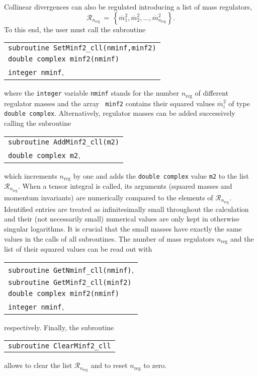 \documentclass[preprint,sort&compress,12pt]{elsarticle}
\makeatletter
\def\bce{\begin{center}}
\def\ece{\end{center}}
\newlength{\parwidth}\newlength{\colonewidth}%
\newcommand{\cpcsub}[1]
{%
\setlength{\parwidth}{\textwidth}\addtolength{\parwidth}{-2.1em}%
\bce
\begin{tabular}[t]{@{}p{\parwidth}@{}}
#1
\end{tabular}
\ece
}%
\makeatother
\begin{document}
Collinear divergences can also be regulated introducing a list of mass regulators,
\begin{equation}
  \mathcal{R}_{n_{\textrm{reg}}}\,=\,\left\{\overline{m}_1^{2},\overline{m}_2^{2},\ldots,
  \overline{m}_{n_{\textrm{reg}}}^{2}\right\}.\label{eq:regmasses}
\end{equation}
To this end, the user must call the subroutine
\cpcsub{
{\tt subroutine  SetMinf2\_cll(nminf,minf2)}\\
{\tt double complex minf2(nminf)} \\
{\tt integer nminf}\;, \\
}
where the {\tt integer} variable {\tt nminf} stands for the number
$n_{\textrm{reg}}$ of different regulator masses and the array {\tt
  minf2} contains their squared values $\overline{m}_i^{2}$ of type
{\tt double complex}. Alternatively, regulator masses can be added
successively calling the subroutine
\cpcsub{
{\tt subroutine  AddMinf2\_cll(m2)}\\
{\tt double complex m2}\;, \\
}
which increments $n_{\textrm{reg}}$ by one and adds the {\tt double complex} value {\tt m2} to the list $\mathcal{R}_{n_{\textrm{reg}}}$.
When a tensor integral is called, its arguments (squared masses and momentum invariants) are numerically compared to the elements of 
$\mathcal{R}_{n_{\textrm{reg}}}$. Identified entries are treated as infinitesimally small throughout the calculation 
and their (not necessarily small) numerical values are only kept in otherwise singular logarithms.
It is crucial that the small masses have exactly the same values in the calls of all subroutines.
The number of mass regulators $n_{\textrm{reg}}$ and the list
of their squared values can be read out with
\cpcsub{
{\tt subroutine  GetNminf\_cll(nminf)}\;,\\
{\tt subroutine  GetMinf2\_cll(minf2)}\\
{\tt double complex minf2(nminf)} \\
{\tt integer nminf}\;, \\
}
respectively. Finally, the subroutine
\cpcsub{
{\tt subroutine  ClearMinf2\_cll}\\
}
allows to clear the list $\mathcal{R}_{n_{\textrm{reg}}}$ and to reset $n_{\textrm{reg}}$ to zero.
\end{document}
